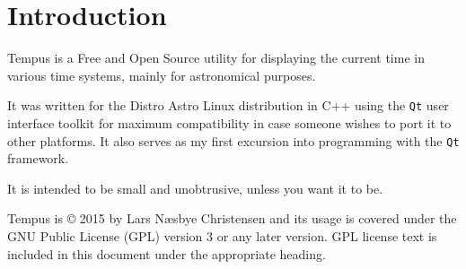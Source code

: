 \section{Introduction}
Tempus is a Free and Open Source utility for displaying the current time in various time systems, mainly for astronomical purposes.

It was written for the Distro Astro Linux distribution in C++ using the \texttt{Qt} user interface toolkit for maximum compatibility in case someone wishes to port it to other platforms.
It also serves as my first excursion into programming with the \texttt{Qt} framework.

It is intended to be small and unobtrusive, unless you want it to be.

Tempus is {\copyright} 2015 by Lars N{\ae}sbye Christensen and its usage is covered under the GNU Public License (GPL) version 3 or any later version. GPL license text is included in this document under the appropriate heading.

